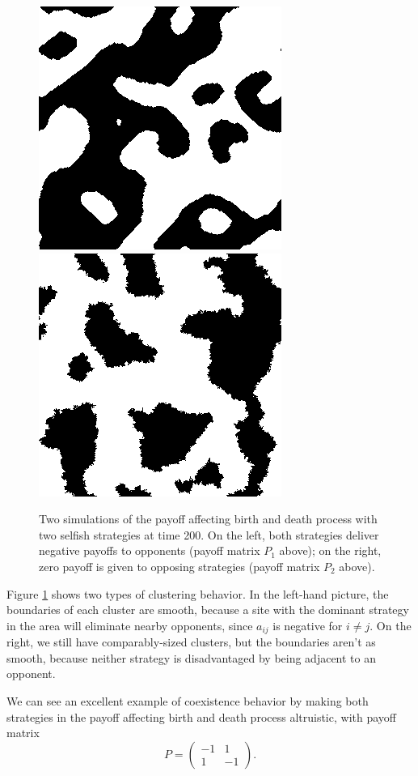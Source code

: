 \documentclass[notitlepage,reqno]{amsart}
\begin{document}
\begin{figure}[h]
\includegraphics[width=.4\textwidth]{./images/Time200-Process0.png}
\includegraphics[width=.4\textwidth]{./images/Time200-Process0-1.png}
\caption{
  Two simulations of the payoff affecting birth and death process with two selfish strategies at time 200. On the left, both strategies deliver negative payoffs to opponents (payoff matrix $P_1$ above); on the right, zero payoff is given to opposing strategies (payoff matrix $P_2$ above).
}
\label{fig:proc1clustering}
\end{figure}

Figure \ref{fig:proc1clustering} shows two types of clustering
behavior. In the left-hand picture, the boundaries of each cluster are
smooth, because a site with the dominant strategy in the area will
eliminate nearby opponents, since $a_{ij}$ is negative for $i\neq
j$. On the right, we still have comparably-sized clusters, but the
boundaries aren't as smooth, because neither strategy is disadvantaged by
being adjacent to an opponent.

We can see an excellent example of coexistence behavior by making both
strategies in the payoff affecting birth and death process altruistic, with payoff matrix
\[
    P = \begin{pmatrix}
      -1 & 1 \\
      1 & -1
    \end{pmatrix}.
\]
\end{document}
